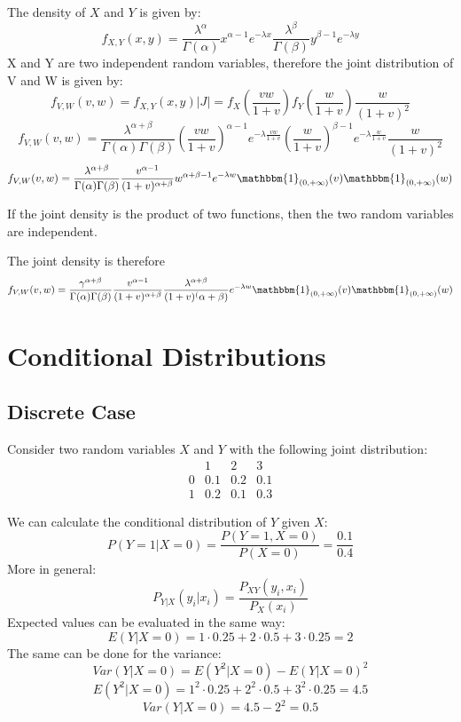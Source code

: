 The density of $X$ and $Y$ is given by:
\[
f_{X, Y}(x, y) = \frac{\lambda^\alpha}{\Gamma(\alpha)} x^{\alpha-1} e^{-\lambda x} \frac{\lambda^\beta}{\Gamma(\beta)} y^{\beta-1} e^{-\lambda y} 
\]
X and Y are two independent random variables, therefore the joint distribution of V and W is given by:
\[
f_{V, W}(v, w) = f_{X, Y}(x, y) \left|J\right| = f_X\left(\frac{vw}{1+v}\right) f_Y\left(\frac{w}{1+v}\right) \frac{w}{(1+v)^2}
\]
\[
f_{V, W}(v, w) = \frac{\lambda^{\alpha+\beta}}{\Gamma(\alpha)\Gamma(\beta)} (\frac{vw}{1+v})^{\alpha-1} e^{-\lambda \frac{vw}{1+v}} (\frac{w}{1+v})^{\beta-1} e^{-\lambda \frac{w}{1+v}} \frac{w}{(1+v)^2}
\]
\[
f_{V, W}(v, w) = \frac{\lambda^{\alpha+\beta}}{\Gamma(\alpha)\Gamma(\beta)} \frac{v^{\alpha-1}}{(1+v)^{\alpha + \beta}} w^{\alpha + \beta-1} e^{-\lambda w} \mathbbm{1}_{(0, +\infty)}(v) \mathbbm{1}_{(0, +\infty)}(w)
\]

If the joint density is the product of two functions, then the two random variables are independent.

The joint density is therefore
\[
f_{V, W}(v, w) = \frac{\gamma^{\alpha+\beta}}{\Gamma(\alpha)\Gamma(\beta)} \frac{v^{\alpha-1}}{(1+v)^{\alpha + \beta}}  \frac{\lambda^{\alpha +\beta}}{(1+v)^(\alpha + \beta)} e^{-\lambda w} \mathbbm{1}_{(0, +\infty)}(v) \mathbbm{1}_{(0, +\infty)}(w)
\]

\section{Conditional Distributions}
\subsection*{Discrete Case}

Consider two random variables $X$ and $Y$ with the following joint distribution:
\[
\begin{array}{c|ccc}
    & 1 & 2 & 3  \\
    \hline
    0 & 0.1 & 0.2 & 0.1 \\
    1 & 0.2 & 0.1 & 0.3
\end{array}
\]

We can calculate the conditional distribution of $Y$ given $X$:
\[
P(Y = 1 | X = 0) = \frac{P(Y=1, X=0)}{P(X=0)} = \frac{0.1}{0.4}
\]
More in general:
\[
P_{Y|X}(y_i | x_i) = \frac{P_{XY}(y_i, x_i)}{P_{X}(x_i)}
\]
Expected values can be evaluated in the same way:
\[
E(Y|X = 0) = 1 \cdot 0.25 + 2 \cdot 0.5 + 3 \cdot 0.25 = 2
\]
The same can be done for the variance:
\[
Var(Y|X = 0) = E(Y^2|X = 0) - E(Y|X = 0)^2
\]
\[
E(Y^2|X = 0) = 1^2 \cdot 0.25 + 2^2 \cdot 0.5 + 3^2 \cdot 0.25 = 4.5
\]
\[
Var(Y|X = 0) = 4.5 - 2^2 = 0.5
\]

